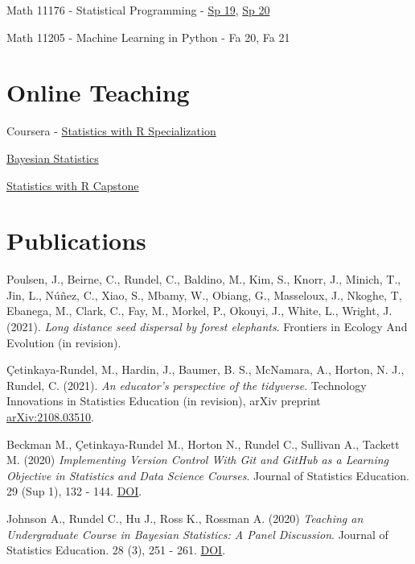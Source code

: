 \documentclass[margin,line]{res}
\begin{document}
\begin{resume}
\begin{list1}
\item[] Math 11176 - Statistical Programming - \href{https://statprog-s1-2019.github.io/}{Sp 19}, \href{https://statprog-s1-2020.github.io/}{Sp 20}

\item[] Math 11205 - Machine Learning in Python - Fa 20, Fa 21
\end{list1}

\pagebreak


\section{\sc Online Teaching}

Coursera - \href{https://www.coursera.org/specializations/statistics}{Statistics with R Specialization}
\begin{list1}
\item[] \href{https://www.coursera.org/learn/bayesian}{Bayesian Statistics}
\item[] \href{https://www.coursera.org/learn/statistics-project}{Statistics with R Capstone}
\end{list1}

\section{\sc Publications}

Poulsen, J., Beirne, C., Rundel, C., Baldino, M., Kim, S., Knorr, J., Minich, T., Jin, L.,  Núñez, C., Xiao, S., Mbamy, W., Obiang, G., Masseloux, J., Nkoghe, T, Ebanega, M., Clark, C., Fay, M., Morkel, P., Okouyi, J., White, L., Wright, J. (2021). {\em Long distance seed dispersal by forest elephants}. Frontiers in Ecology And Evolution (in revision).

Çetinkaya-Rundel, M., Hardin, J., Baumer, B. S., McNamara, A., Horton, N. J., Rundel, C. (2021). {\em An educator's perspective of the tidyverse}. Technology Innovations in Statistics Education (in revision), arXiv preprint \href{https://arxiv.org/abs/2108.03510}{arXiv:2108.03510}.

\vspace{-0.15cm}
Beckman M., Çetinkaya-Rundel M., Horton N., Rundel C., Sullivan A., Tackett M. (2020) {\em Implementing Version Control With Git and GitHub as a Learning Objective in Statistics and Data Science Courses}. Journal of Statistics Education. 29 (Sup 1), 132 - 144. \href{https://doi.org/10.1080/10691898.2020.1848485}{DOI}.

\vspace{-0.15cm}
Johnson A., Rundel C., Hu J., Ross K., Rossman A. (2020) {\em Teaching an Undergraduate Course in Bayesian Statistics: A Panel Discussion}. Journal of Statistics Education. 28 (3), 251 - 261. \href{https://doi.org/10.1080/10691898.2020.1845499}{DOI}.



\end{resume}
\end{document}
